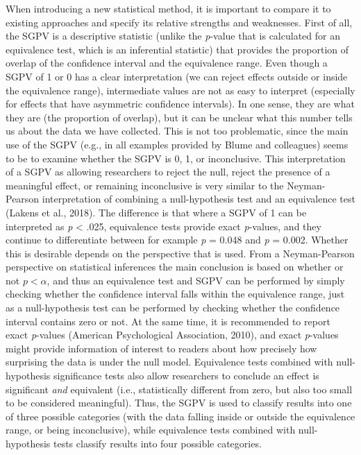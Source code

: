 \documentclass[floatsintext,man]{apa6}
\theoremstyle{definition}
\theoremstyle{definition}
\theoremstyle{definition}
\theoremstyle{remark}
\begin{document}
When introducing a new statistical method, it is important to compare it
to existing approaches and specify its relative strengths and
weaknesses. First of all, the SGPV is a descriptive statistic (unlike
the \emph{p}-value that is calculated for an equivalence test, which is
an inferential statistic) that provides the proportion of overlap of the
confidence interval and the equivalence range. Even though a SGPV of 1
or 0 has a clear interpretation (we can reject effects outside or inside
the equivalence range), intermediate values are not as easy to interpret
(especially for effects that have asymmetric confidence intervals). In
one sense, they are what they are (the proportion of overlap), but it
can be unclear what this number tells us about the data we have
collected. This is not too problematic, since the main use of the SGPV
(e.g., in all examples provided by Blume and colleagues) seems to be to
examine whether the SGPV is 0, 1, or inconclusive. This interpretation
of a SGPV as allowing researchers to reject the null, reject the
presence of a meaningful effect, or remaining inconclusive is very
similar to the Neyman-Pearson interpretation of combining a
null-hypothesis test and an equivalence test (Lakens et al., 2018). The
difference is that where a SGPV of 1 can be interpreted as \emph{p}
\textless{} .025, equivalence tests provide exact \emph{p}-values, and
they continue to differentiate between for example \emph{p} = 0.048 and
\emph{p} = 0.002. Whether this is desirable depends on the perspective
that is used. From a Neyman-Pearson perspective on statistical
inferences the main conclusion is based on whether or not
\(p < \alpha\), and thus an equivalence test and SGPV can be performed
by simply checking whether the confidence interval falls within the
equivalence range, just as a null-hypothesis test can be performed by
checking whether the confidence interval contains zero or not. At the
same time, it is recommended to report exact \emph{p}-values (American
Psychological Association, 2010), and exact \emph{p}-values might
provide information of interest to readers about how precisely how
surprising the data is under the null model. Equivalence tests combined
with null-hypothesis significance tests also allow researchers to
conclude an effect is significant \emph{and} equivalent (i.e.,
statistically different from zero, but also too small to be considered
meaningful). Thus, the SGPV is used to classify results into one of
three possible categories (with the data falling inside or outside the
equivalence range, or being inconclusive), while equivalence tests
combined with null-hypothesis tests classify results into four possible
categories.
\end{document}
